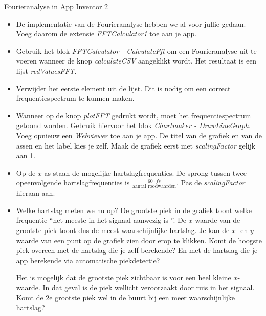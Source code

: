 \begin{opdracht}{Fourieranalyse in App Inventor 2}
\begin{itemize}
 	\item De implementatie van de Fourieranalyse hebben we al voor jullie gedaan. Voeg daarom de extensie \emph{FFTCalculator1} toe aan je app.
 	
	\item Gebruik het blok \emph{FFTCalculator - CalculateFft} om een Fourieranalyse uit te voeren wanneer de knop \emph{calculateCSV} aangeklikt wordt. Het resultaat is een lijst \emph{redValuesFFT}. 
	
	\item Verwijder het eerste element uit de lijst. Dit is nodig om een correct frequentiespectrum te kunnen maken.
	
	\item Wanneer op de knop \emph{plotFFT} gedrukt wordt, moet het frequentiespectrum getoond worden. Gebruik hiervoor het blok \emph{Chartmaker - DrawLineGraph}. Voeg opnieuw een \emph{Webviewer} toe aan je app. De titel van de grafiek en van de assen en het label kies je zelf. Maak de grafiek eerst met \emph{scalingFactor} gelijk aan 1.
	
	\item Op de $x$-as staan de mogelijke hartslagfrequenties. De sprong tussen twee opeenvolgende hartslagfrequenties is $\frac{60 \cdot fs}{\text{aantal roodwaarden}}$. Pas de \emph{scalingFactor} hieraan aan.
	
	\item Welke hartslag meten we nu op? De grootste piek in de grafiek toont welke frequentie \textquotedblleft het meeste in het signaal aanwezig is \textquotedblright. De $x$-waarde van de grootste piek toont dus de meest waarschijnlijke hartslag. Je kan de $x$- en $y$- waarde van een punt op de grafiek zien door erop te klikken. Komt de hoogste piek overeen met de hartslag die je zelf berekende? En met de hartslag die je app berekende via automatische piekdetectie?
	
	\begin{opmerking}
		Het is mogelijk dat de grootste piek zichtbaar is voor een heel kleine $x$-waarde. In dat geval is de piek wellicht veroorzaakt door ruis in het signaal. Komt de 2e grootste piek wel in de buurt bij een meer waarschijnlijke hartslag?
	\end{opmerking}
\end{itemize}
\end{opdracht}






